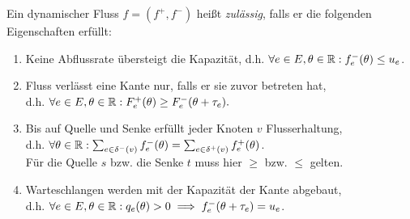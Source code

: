 \begin{definition}
	Ein dynamischer Fluss $f=(f^+, f^-)$ heißt \emph{zulässig}, falls er die folgenden Eigenschaften erfüllt:
	\begin{enumerate}[label=(F\arabic*)]
		\item\label{def-feasible-flow-capacity} Keine Abflussrate übersteigt die Kapazität, d.h. $\forall e\in E, \theta\in\mathbb{R}: f_e^-(\theta)\leq u_e$.
		\item\label{def-feasible-flow-no-negative-flow} Fluss verlässt eine Kante nur, falls er sie zuvor betreten hat,\\ d.h. $\forall e\in E, \theta\in\mathbb{R}: F_e^+(\theta) \geq F_e^-(\theta + \tau_e).$
		\item\label{def-feasible-flow-no-flow-at-node} Bis auf Quelle und Senke erfüllt jeder Knoten $v$ Flusserhaltung,\\ d.h. $\forall\theta\in\mathbb{R}: \sum_{e\in\delta^-(v)}f^-_e(\theta) = \sum_{e\in\delta^+(v)} f_e^+(\theta)$.\\
		Für die Quelle $s$ bzw. die Senke $t$ muss hier $\geq$ bzw. $\leq$ gelten.
		\item\label{def-feasible-flow-queue-with-capacity} Warteschlangen werden mit der Kapazität der Kante abgebaut,\\ d.h. $\forall e\in E, \theta\in\mathbb{R}: q_e(\theta) > 0 \implies f_e^-(\theta + \tau_e) = u_e$.
	\end{enumerate}
\end{definition}


